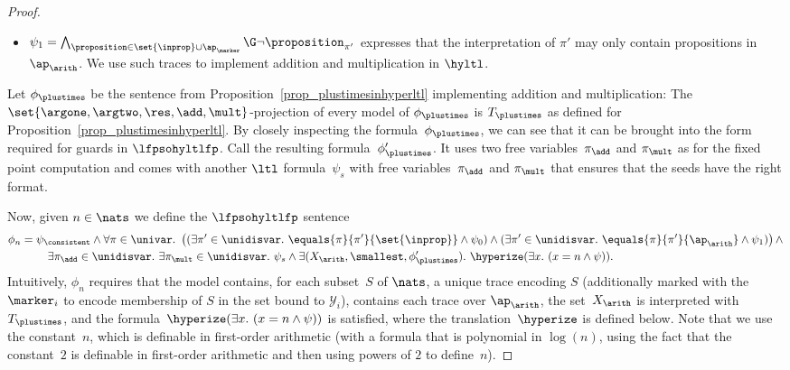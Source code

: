 \begin{proof}
\begin{itemize}
    As explained above, we use the markings to encode the membership of such sets in the $\mathcal{Y}_i$, thereby mimicking the existential quantification of the $\mathcal{Y}_i$.

    However, we need to ensure that this marking is done consistently, i.e., there is no trace~$t$ over $\set{\inprop}$ in the model that is both marked by $m_i$ and not marked by $m_i$. 
    This could happen, as these are just two different traces over $\ap$. 
    However, the formula
    \[
    \psi_\consistent = \forall \pi \in \unidisvar.\ \forall \pi' \in \unidisvar.\ \equals{\pi}{\pi'}{\set{x}} \rightarrow \equals{\pi}{\pi'}{\set{\inprop} \cup \ap_\marker}
    \]
    disallows this.
    
    \item $\psi_1 = \bigwedge_{\proposition \in \set{\inprop} \cup \ap_\marker}\G\neg\proposition_{\pi'}$ expresses that the interpretation of $\pi'$ may only contain propositions in $\ap_\arith$. We use such traces to implement addition and multiplication in $\hyltl$.
\end{itemize}
Let $\phi_\plustimes$ be the sentence from Proposition~\ref{prop_plustimesinhyperltl} implementing addition and multiplication: 
The $\set{\argone, \argtwo, \res, \add, \mult}$-projection of every model of $\phi_\plustimes$ is $T_\plustimes$ as defined for Proposition~\ref{prop_plustimesinhyperltl}. 
\label{pageref_plustimesaslfp} By closely inspecting the formula~$\phi_\plustimes$, we can see that it can be brought into the form required for guards in $\lfpsohyltlfp$. Call the resulting formula~$\phi_\plustimes'$. It uses two free variables~$\pi_\add$ and $\pi_\mult$ as  for the fixed point computation and comes with another $\ltl$ formula~$\psi_s$ with free variables~$\pi_\add$ and $\pi_\mult$ that ensures that the seeds have the right format.

Now, given $n\in\nats$ we define the $\lfpsohyltlfp$ sentence
\begin{align*}
\phi_n = {}&{} \psi_\consistent \wedge \forall\pi \in\univar.\ \left(
(\exists \pi' \in \unidisvar.\ \equals{\pi}{\pi'}{\set{\inprop}} \wedge \psi_0) \wedge
(\exists \pi' \in \unidisvar.\ \equals{\pi}{\pi'}{\ap_\arith} \wedge \psi_1)\right)
\wedge \\
{}&{}\quad\exists \pi_\add \in \unidisvar.\ \exists \pi_\mult \in \unidisvar.\ \psi_s \wedge \exists(X_\arith, \smallest, \phi_\plustimes').\ \hyperize(\exists x.\ ( x = n \wedge \psi)).    
\end{align*}
Intuitively, $\phi_n$ requires that the model contains, for each subset~$S$ of $\nats$, a unique trace encoding $S$ (additionally marked with the $\marker_i$ to encode membership of $S$ in the set bound to $\mathcal{Y}_i$), contains each trace over $\ap_\arith$, the set~$X_\arith$ is interpreted with $T_\plustimes$, and the formula~$\hyperize(\exists x.\ ( x = n \wedge \psi))$ is satisfied, where the translation~$\hyperize$ is defined below.
Note that we use the constant~$n$, which is definable in first-order arithmetic (with a formula that is polynomial in $\log(n)$, using the fact that the constant~$2$ is definable in first-order arithmetic and then using powers of $2$ to define~$n$).


\end{proof}
